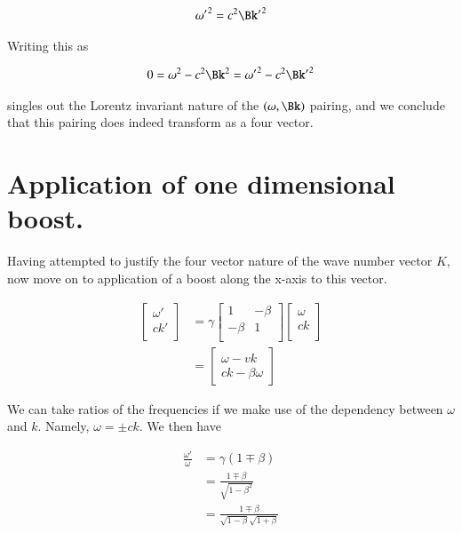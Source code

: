 \begin{align}
{\omega'}^2 = c^2 {\Bk'}^2 
\end{align}

Writing this as

\begin{align}
0 = {\omega}^2 - c^2 {\Bk}^2 = {\omega'}^2 - c^2 {\Bk'}^2 
\end{align}

singles out the Lorentz invariant nature of the $(\omega, \Bk)$ pairing, and we conclude that this pairing 
does indeed transform as a four vector.

\section{Application of one dimensional boost.}

Having attempted to justify the four vector nature of the wave number vector $K$, now move on to application of a boost along the x-axis to this vector.

\begin{align*}
\begin{bmatrix}
\omega' \\
c k' \\
\end{bmatrix}
&=
\gamma
\begin{bmatrix}
1 & -\beta \\
-\beta& 1 \\
\end{bmatrix}
\begin{bmatrix}
\omega \\
c k \\
\end{bmatrix} 
\\
&=
\begin{bmatrix}
\omega - v k \\
c k - \beta \omega
\end{bmatrix} 
\end{align*}

We can take ratios of the frequencies if we make use of the dependency between $\omega$ and $k$.  Namely, $\omega = \pm c k$.  We then have

\begin{align*}
\frac{\omega'}{\omega}
&= \gamma(1 \mp \beta) \\
&= \frac{1 \mp \beta}{\sqrt{1 - \beta^2}} \\
&= \frac{1 \mp \beta}{\sqrt{1 - \beta}\sqrt{1 + \beta}} \\
\end{align*}

